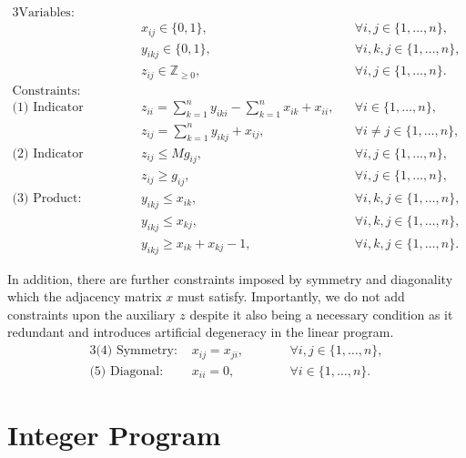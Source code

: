 \documentclass[11pt]{article}
\begin{document}
\begin{alignat}{3}
\text{Variables: } & \nonumber \\ 
& x_{ij} \in \{0,1\}, 
&& \forall i,j \in \{1, \dots, n\}, \label{eq::IP_x_variable} \\ 
& y_{ikj} \in \{0,1\}, 
&& \forall i,k,j \in \{1, \dots, n\}, \label{eq::IP_y_variable} \\
& z_{ij} \in \mathbb{Z}_{\geq 0}, 
&& \forall i,j \in \{1, \dots, n\}. \label{eq::IP_z_variable} \\
\text{Constraints: } & \nonumber \\
\text{(1) Indicator argument: } 
& z_{ii} = \sum_{k = 1}^{n}y_{iki} - \sum_{k = 1}^{n} x_{ik} + x_{ii}, 
&& \forall i \in \{1, \dots, n\} , \label{eq::IP_fund_matrix} \\
& z_{ij} = \sum_{k = 1}^{n}y_{ikj} + x_{ij}, 
&& \forall i \neq j \in \{1, \dots, n\} , \label{eq::IP_indicator_arg} \\
\text{(2) Indicator function: } 
& z_{ij} \leq M g_{ij}, 
&& \forall i, j \in \{1, \dots, n\}, \label{eq::IP_indicator_upper} \\
& z_{ij} \geq g_{ij}, 
&& \forall i, j \in \{1, \dots, n\}, \label{eq::IP_indicator_lower}\\
\text{(3) Product: } 
& y_{ikj} \leq x_{ik}, 
&& \forall i, k, j \in \{1, \dots, n\}, \label{eq::IP_product_upper_first} \\
& y_{ikj} \leq x_{kj}, 
&& \forall i, k, j \in \{1, \dots, n\}, \label{eq::IP_product_upper_second} \\
& y_{ikj} \geq x_{ik} + x_{kj} - 1, 
&& \forall i, k, j \in \{1, \dots, n\} \label{eq::IP_product_lower}.
\end{alignat} \label{eq::integer_program}

In addition, there are further constraints imposed by symmetry and diagonality which the adjacency matrix $x$ must satisfy. 
Importantly, we do not add constraints upon the auxiliary $z$ despite it also being a necessary condition as it redundant and 
introduces artificial degeneracy in the linear program. 
\begin{alignat}{3} 
\text{(4) Symmetry: } 
& x_{ij} = x_{ji}, 
&&\qquad \forall i,j \in \{1, \dots, n\}, \label{eq::IP_symmetry_x} \\
\text{(5) Diagonal: } 
& x_{ii} = 0, 
&&\qquad \forall i \in \{1, \dots, n\}.  \label{eq::IP_diagonal_x} 
\end{alignat}

\section{Integer Program}
\end{document}
